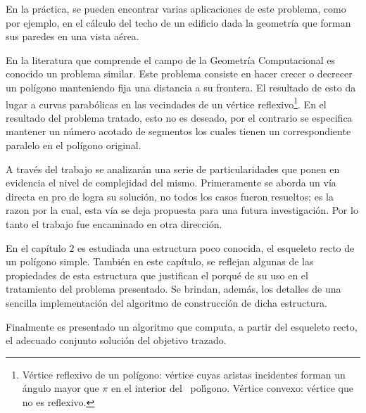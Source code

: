 \documentclass[12pt,english]{report}
\begin{document}
   
En la pr\'actica,  se pueden encontrar varias aplicaciones de este problema, como por ejemplo, en el c\'alculo del techo de un edificio dada la geometr\'ia que forman sus paredes en una vista a\'erea. 

En la literatura que comprende el campo de la Geometr\'ia Computacional es conocido un problema similar. Este problema consiste en hacer crecer o decrecer un pol\'igono manteniendo fija una distancia a su frontera. El resultado de esto da lugar a curvas parab\'olicas en las vecindades de un v\'ertice reflexivo\footnote[1]{%
V\'{e}rtice reflexivo de un pol\'igono: v\'{e}rtice cuyas aristas incidentes forman un \'{a}ngulo mayor que $\pi$ en el interior del \ pol\'{\i}gono. V\'ertice convexo: v\'ertice que no es reflexivo.}. En el resultado del problema tratado, esto no es deseado, por el contrario se especifica mantener un n\'umero acotado de segmentos los cuales tienen un correspondiente paralelo en el pol\'igono original.  

A trav\'es del trabajo se analizar\'an una serie de particularidades que ponen en evidencia el nivel de complejidad del mismo. Primeramente se aborda un v\'ia directa en pro de logra su soluci\'on, no todos los casos fueron resueltos; es la razon por la cual, esta v\'ia se deja propuesta para una futura investigaci\'on. Por lo tanto el trabajo fue encaminado en otra direcci\'on. 

En el cap\'itulo $2$ es estudiada una estructura poco conocida, el esqueleto recto de un pol\'igono simple. Tambi\'en en este cap\'itulo, se reflejan algunas de las propiedades de esta estructura que justifican el porqu\'e de su uso en el tratamiento del problema presentado. Se brindan, adem\'as, los detalles de una sencilla implementaci\'on del algoritmo de construcci\'on de dicha estructura. 

Finalmente es presentado un algoritmo que computa, a partir del esqueleto recto, el adecuado conjunto soluci\'on del objetivo trazado.

\end{document}

